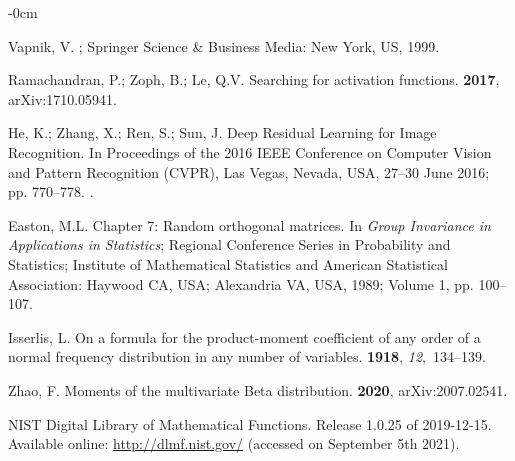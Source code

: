 \documentclass[appliedmath,article,accept,pdftex,moreauthors]{Definitions/mdpi}
\begin{document}
\begin{adjustwidth}{-\extralength}{0cm}
\begin{thebibliography}{999}
  

Vapnik, V.
; Springer Science \&
  Business Media:  New York, US, %
  1999.

Ramachandran, P.; Zoph, B.; Le, Q.V.
\newblock Searching for activation functions.
 {\bf 2017},  arXiv:1710.05941.

He, K.; Zhang, X.; Ren, S.; Sun, J.
\newblock Deep Residual Learning for Image Recognition.
\newblock In Proceedings of the 2016 IEEE Conference on Computer Vision and
  Pattern Recognition (CVPR),  Las Vegas, Nevada, USA, 27--30 June 2016; pp. 770--778.
.%

Easton, M.L. Chapter 7: Random orthogonal matrices.
\newblock In {\em Group Invariance in Applications in Statistics}; Regional Conference Series in
  Probability and Statistics; Institute of
  Mathematical Statistics and American Statistical Association: Haywood CA, USA;  
  Alexandria VA, USA, 1989; Volume 1, pp. 100--107.

Isserlis, L.
\newblock On a formula for the product-moment coefficient of any order of a
  normal frequency distribution in any number of variables.
 {\bf 1918}, {\em 12},~134--139.

Zhao, F.
\newblock Moments of the multivariate Beta distribution.
 {\bf 2020}, arXiv:2007.02541.

{ NIST Digital Library of Mathematical Functions}. Release 1.0.25 of 2019-12-15.
\newblock  Available online: \url{http://dlmf.nist.gov/}  (accessed on September 5th 2021). %


\end{thebibliography}


%


\end{adjustwidth}
\end{document}

